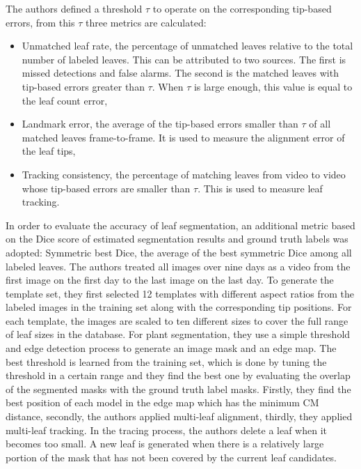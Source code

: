 The authors defined a threshold $\tau$ to operate on the corresponding tip-based errors, from this $\tau$ three metrics are calculated:
\begin{itemize}
\item Unmatched leaf rate, the percentage of unmatched leaves relative to the total number of labeled leaves. This can be attributed to two sources. The first is missed
detections and false alarms. The second is the matched leaves with tip-based errors greater than $\tau$. When $\tau$ is large enough, this value is equal to the leaf
count error,
\item Landmark error, the average of the tip-based errors smaller than $\tau$ of all matched leaves frame-to-frame. It is used to measure the alignment error of the leaf tips,
\item Tracking consistency, the percentage of matching leaves from video to video whose tip-based errors are smaller than $\tau$. This is used to measure leaf tracking.
\end{itemize}
In order to evaluate the accuracy of leaf segmentation, an additional metric based on the Dice score of
estimated segmentation results and ground truth labels was adopted: Symmetric best Dice, the average of the best symmetric Dice among all labeled leaves.
The authors treated all images over nine days as a video from the first image on the first day to the last image on the last day. To generate the template set, they first
selected 12 templates with different aspect ratios from the labeled images in the training set along with the corresponding tip positions. For each template, the
images are scaled to ten different sizes to cover the full range of leaf sizes in the database. For plant segmentation, they use a simple threshold and edge detection
process to generate an image mask and an edge map. The best threshold is learned from the training set, which is done by tuning the threshold in a certain range and
they find the best one by evaluating the overlap of the segmented masks with the ground truth label masks. Firstly, they find the best position of each model in the edge
map which has the minimum CM distance, secondly, the authors applied multi-leaf alignment, thirdly, they applied multi-leaf tracking. In the tracing process, the authors delete
a leaf when it becomes too small. A new leaf is generated when there is a relatively large portion of the mask that has not been covered by the current leaf candidates.


